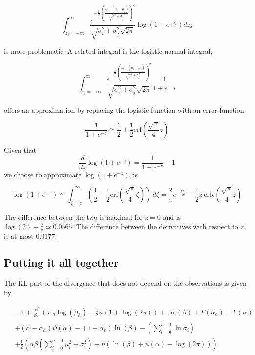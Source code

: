 \documentclass[12pt]{article}
\begin{document}
$$\int_{z_\delta=-\infty}^{\infty}
\frac{e^{-\frac{1}{2}\left(\frac{z_\delta - (\mu_i - \mu_j)}{\sqrt{\sigma_i^2 + \sigma_j^2}}\right)^2}}{\sqrt{\sigma_i^2 + \sigma_j^2} \sqrt{2 \pi}} \log\left(1 + e^{-z_\delta}\right) dz_\delta$$

is more problematic. A related integral is the logistic-normal integral,

$$\int_{z_\delta=-\infty}^{\infty}
\frac{e^{-\frac{1}{2}\left(\frac{z_\delta - (\mu_i - \mu_j)}{\sqrt{\sigma_i^2 + \sigma_j^2}}\right)^2}}{\sqrt{\sigma_i^2 + \sigma_j^2} \sqrt{2 \pi}} \frac{1}{1 + e^{-z_\delta}}$$

\cite{crooks2009logistic} offers an approximation by replacing the logistic function with an error function:

$$\frac{1}{1+e^{-z}} \simeq \frac{1}{2} + \frac{1}{2} \text{erf}\left(\frac{\sqrt{\pi}}{4} z\right)$$

Given that $$\frac{d}{d z}\log\left(1 + e^{-z}\right) = \frac{1}{1 + e^{-z}} - 1$$ we choose to approximate $\log\left(1 + e^{-z}\right)$
as

$$\log\left(1 + e^{-z}\right) \simeq \int_{\zeta=z}^{\infty} \left(\frac{1}{2} - \frac{1}{2} \text{erf}\left(\frac{\sqrt{\pi}}{4} \zeta \right)\right)~d\zeta =
\frac{2}{\pi}e^{-\frac{\pi z^2}{16}} - \frac{1}{2} z~\mathrm{erfc}\left(\frac{\sqrt{\pi}}{4} z\right)$$

The difference between the two is maximal for $z = 0$ and is $\log(2) - \frac{2}{\pi} \simeq 0.0565$. The difference between the derivatives with respect to $z$ is at most $0.0177$.

\subsection{Putting it all together}

The KL part of the divergence that does not depend on the observations is given by

\begin{align*}
    \begin{split}
    &-\alpha + \frac{\alpha\beta}{\beta_h} + \alpha_h \log(\beta_h) - \frac{1}{2} n (1 + \log(2 \pi)) + \ln(\beta) + \Gamma(\alpha_h) - \Gamma(\alpha)\\
    &+ (\alpha - \alpha_h) \psi(\alpha) - (1 + \alpha_h) \ln(\beta) - \left(\sum_{i=0}^{n-1} \ln\sigma_i\right)\\
    &+ \frac{1}{2} \left(\alpha\beta \left(\sum_{i=0}^{n-1} \mu_i^2 + \sigma_i^2\right) - n (\ln(\beta) + \psi(\alpha) - \log(2 \pi))\right)
    \end{split}
    \end{align*}
\end{document}
